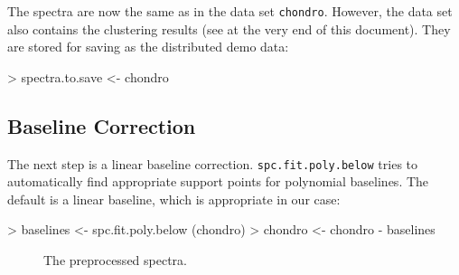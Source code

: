 \documentclass[english, a4paper, 10pt, headings=small, DIV11]{scrartcl}
\renewenvironment{Schunk}{\vspace{0pt}\begin{small}}{\end{small}\vspace{0pt}}
\newcommand{\Robject}[2][]{\texorpdfstring{\nohyphens{#1\texttt{#2}}}{#2}}
\newcommand{\Rfunction}[2][]{\texorpdfstring{\nohyphens{#1\texttt{#2}}}{#2}}
\begin{document}
The spectra are now the same as in the data set \Robject{chondro}. However, the data set also contains the clustering results (see at the very end of this document). They are stored for saving as the distributed demo data:
\begin{Schunk}
\begin{Sinput}
> spectra.to.save <- chondro
\end{Sinput}
\end{Schunk}

\subsection{Baseline Correction}
The next step is a linear baseline correction. \Rfunction{spc.fit.poly.below}
tries to automatically find appropriate support points for polynomial
baselines. The default is a linear baseline, which is appropriate
in our case:
\begin{Schunk}
\begin{Sinput}
> baselines <- spc.fit.poly.below (chondro)
> chondro <- chondro - baselines
\end{Sinput}
\end{Schunk}

\begin{figure}[tbh]
\quad%
\caption{\label{fig:bl}The preprocessed spectra.}
\end{figure}
\end{document}
